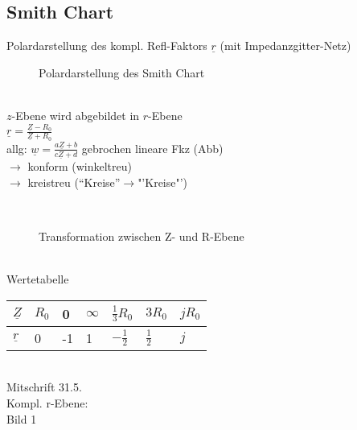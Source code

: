 \subsection{Smith Chart}
Polardarstellung des kompl. Refl-Faktors $\underline{r}$ (mit
Impedanzgitter-Netz)\\
\begin{figure}[!h]
	\centering
 	
	\caption{Polardarstellung des Smith Chart}
	\label{fig:leitungstheorie:smith}
\end{figure}\\
$z$-Ebene wird abgebildet in $r$-Ebene\\
$\underline{r}=\frac{\underline{Z}-R_0}{\underline{Z}+R_0}$\\
allg: $\underline{w}=\frac{a\underline{Z}+b}{c\underline{Z}+d}$ gebrochen
lineare Fkz (Abb)\\
$\rightarrow$ konform (winkeltreu)\\
$\rightarrow$ kreistreu ("`Kreise"'$\rightarrow$"'Kreise"')\\
\begin{figure}[!h]
\centering
\subfloat[Z-Ebene]{
	
	\label{fig:leitungstheorie:smith:zrz}
}
\qquad
\subfloat[R-Ebene]{
	
	\label{fig:leitungstheorie:smith:zrr}
}\\
\caption{Transformation zwischen Z- und R-Ebene}
\label{fig:leitungstheorie:smith}
\end{figure}\\
Wertetabelle\\
\begin{tabular}{|l|l|l|l|l|l|l|}
	\hline
	$\underline{Z}$ & $R_0$ & 0 & $\infty$ & $\frac{1}{3}R_0$ & $3R_0$ & $jR_0$\\
	\hline
	$\underline{r}$ & 0 & -1 & 1 & $-\frac{1}{2}$ & $\frac{1}{2}$ & $j$\\
	\hline
\end{tabular}\\
Mitschrift 31.5.\\
Kompl. r-Ebene:\\
Bild 1\\
